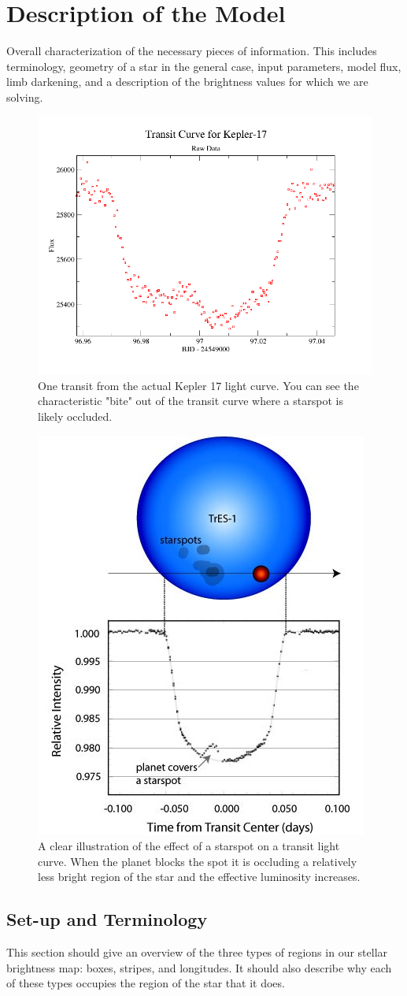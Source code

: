 \documentclass[iop]{emulateapj}
\begin{document}
\section{Description of the Model \label{description}}
Overall characterization of the necessary pieces of information. This includes terminology, geometry of a star in the general case, input parameters, model flux, limb darkening, and a description of the brightness values for which we are solving.
\begin{figure}[h]
	\centering
	\includegraphics[width=.5\textwidth]{images/k17trans.png}
	\caption{One transit from the actual Kepler 17 light curve. You can see the characteristic "bite" out of the transit curve where a starspot is likely occluded.}
	\label{k17trans}
\end{figure}
\begin{figure}[h]
	\centering
	\includegraphics[width=.5\textwidth]{images/tres1hst.jpg}
	\caption{A clear illustration of the effect of a starspot on a transit light curve. When the planet blocks the spot it is occluding a relatively less bright region of the star and the effective luminosity increases.}
	\label{tres1}
\end{figure}

\subsection{Set-up and Terminology \label{description}}
This section should give an overview of the three types of regions in our stellar brightness map: boxes, stripes, and longitudes. It should also describe why each of these types occupies the region of the star that it does.
\end{document}
